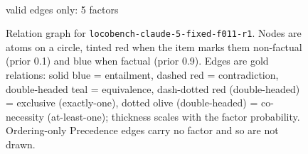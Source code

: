 \documentclass[11pt]{article}
\begin{document}
\begin{figure}[htbp]
\begin{minipage}[t]{0.48\linewidth}
{
}
\\[2pt]{\footnotesize valid edges only: 5 factors}
\end{minipage}
\caption{Relation graph for \texttt{locobench-claude-5-fixed-f011-r1}. Nodes are atoms on a circle, tinted red when the item marks them non-factual (prior 0.1) and blue when factual (prior 0.9). Edges are gold relations: solid blue = entailment, dashed red = contradiction, double-headed teal = equivalence, dash-dotted red (double-headed) = exclusive (exactly-one), dotted olive (double-headed) = co-necessity (at-least-one); thickness scales with the factor probability. Ordering-only Precedence edges carry no factor and so are not drawn.}
\label{fig:graph-locobench-claude-5-fixed-f011-r1}
\end{figure}
\end{document}
